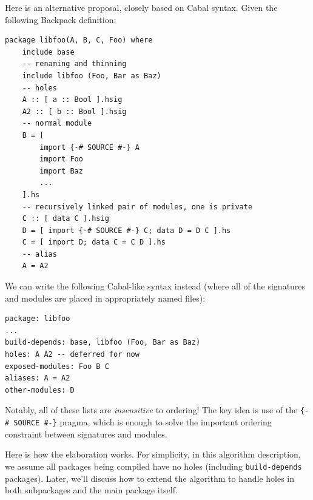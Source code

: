 \documentclass{article}
\begin{document}
Here is an alternative proposal, closely based on Cabal syntax.  Given
the following Backpack definition:

\begin{verbatim}
package libfoo(A, B, C, Foo) where
    include base
    -- renaming and thinning
    include libfoo (Foo, Bar as Baz)
    -- holes
    A :: [ a :: Bool ].hsig
    A2 :: [ b :: Bool ].hsig
    -- normal module
    B = [
        import {-# SOURCE #-} A
        import Foo
        import Baz
        ...
    ].hs
    -- recursively linked pair of modules, one is private
    C :: [ data C ].hsig
    D = [ import {-# SOURCE #-} C; data D = D C ].hs
    C = [ import D; data C = C D ].hs
    -- alias
    A = A2
\end{verbatim}

We can write the following Cabal-like syntax instead (where
all of the signatures and modules are placed in appropriately
named files):

\begin{verbatim}
package: libfoo
...
build-depends: base, libfoo (Foo, Bar as Baz)
holes: A A2 -- deferred for now
exposed-modules: Foo B C
aliases: A = A2
other-modules: D
\end{verbatim}

Notably, all of these lists are \emph{insensitive} to ordering!
The key idea is use of the \verb|{-# SOURCE #-}| pragma, which
is enough to solve the important ordering constraint between
signatures and modules.

Here is how the elaboration works.  For simplicity, in this algorithm
description, we assume all packages being compiled have no holes
(including \verb|build-depends| packages). Later, we'll discuss how to
extend the algorithm to handle holes in both subpackages and the main
package itself.
\end{document}
